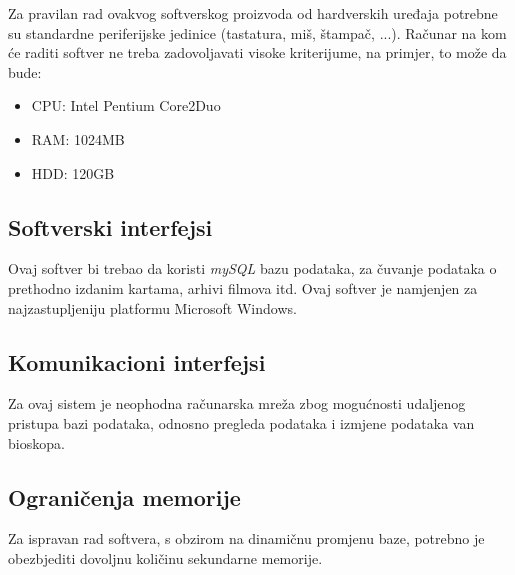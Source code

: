 Za pravilan rad ovakvog softverskog proizvoda od hardverskih uređaja potrebne su standardne periferijske jedinice (tastatura, miš, štampač, ...). Računar na kom će raditi softver ne treba zadovoljavati visoke kriterijume, na primjer, to može da bude:
\begin{itemize}
  \item CPU: Intel Pentium Core2Duo 
  \item RAM: 1024MB
  \item HDD: 120GB
\end{itemize}
%
%
%
%
\subsection{Softverski interfejsi}

Ovaj softver bi trebao da koristi \textit{mySQL} bazu podataka, za čuvanje podataka o prethodno izdanim kartama, arhivi filmova itd. Ovaj softver je namjenjen za najzastupljeniju platformu Microsoft Windows.

\subsection{Komunikacioni interfejsi} 

Za ovaj sistem je neophodna računarska mreža zbog mogućnosti udaljenog pristupa bazi podataka, odnosno pregleda podataka i izmjene podataka van bioskopa.
%
%

\subsection{Ograničenja memorije}

Za ispravan rad softvera, s obzirom na dinamičnu promjenu baze, potrebno je obezbjediti dovoljnu količinu sekundarne memorije. 

